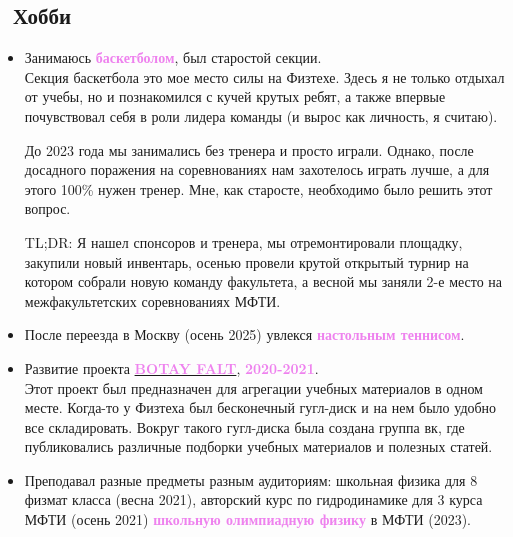 \documentclass[a4paper,12pt]{article}
\begin{document}
	\subsection*{\faHeart\ Хобби}
	\begin{itemize}
		\item Занимаюсь \textcolor{violet}{\textbf{баскетболом}}, был старостой секции. \\
		Секция баскетбола это мое место силы на Физтехе. Здесь я не только отдыхал от учебы, но и познакомился с кучей крутых ребят, а также впервые почувствовал себя в роли лидера команды (и вырос как личность, я считаю).
		
		До 2023 года мы занимались без тренера и просто играли. Однако, после досадного поражения на соревнованиях нам захотелось играть лучше, а для этого 100\% нужен тренер. Мне, как старосте, необходимо было решить этот вопрос. 
		
		TL;DR: Я нашел спонсоров и тренера, мы отремонтировали площадку, закупили новый инвентарь, осенью провели крутой открытый турнир на котором собрали новую команду факультета, а весной мы заняли 2-е место на межфакультетских соревнованиях МФТИ.
		
		\item После переезда в Москву (осень 2025) увлекся \textcolor{violet}{\textbf{настольным теннисом}}.
		
		\item Развитие проекта \href{https://vk.com/botay_falt}{\textcolor{violet}{\textbf{BOTAY FALT}}}, \textcolor{violet}{\textbf{2020-2021}}. \\
		Этот проект был предназначен для агрегации учебных материалов в одном месте. Когда-то у Физтеха был бесконечный гугл-диск и на нем было удобно все складировать. Вокруг такого гугл-диска была создана группа вк, где публиковались различные подборки учебных материалов и полезных статей.
		
		\item Преподавал разные предметы разным аудиториям: школьная физика для 8 физмат класса (весна 2021), авторский курс по гидродинамике для 3 курса МФТИ (осень 2021) \textcolor{violet}{\textbf{школьную олимпиадную физику}} в МФТИ (2023).
	\end{itemize}
	
\end{document}

